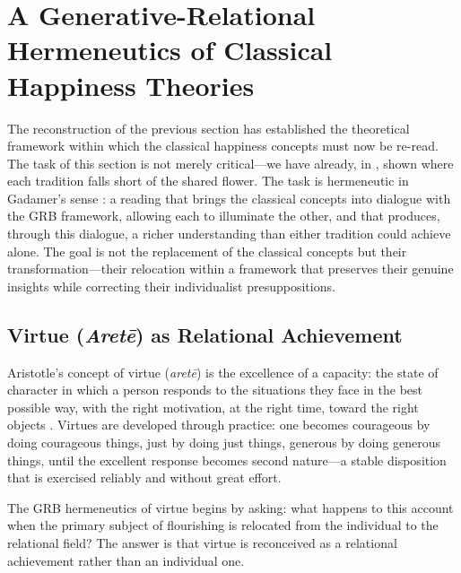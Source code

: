 \section{A Generative-Relational Hermeneutics of Classical Happiness Theories}
\label{p14:sec:hermeneutics}

\noindent
The reconstruction of the previous section has established the theoretical framework within which the classical happiness concepts must now be re-read. The task of this section is not merely critical---we have already, in , shown where each tradition falls short of the shared flower. The task is hermeneutic in Gadamer's sense \parencite{gadamer2004}: a reading that brings the classical concepts into dialogue with the GRB framework, allowing each to illuminate the other, and that produces, through this dialogue, a richer understanding than either tradition could achieve alone. The goal is not the replacement of the classical concepts but their transformation---their relocation within a framework that preserves their genuine insights while correcting their individualist presuppositions.

\subsection{Virtue (\emph{Aret\={e}}) as Relational Achievement}
\label{p14:subsec:arete}

\noindent
Aristotle's concept of virtue (\emph{aret\={e}}) is the excellence of a capacity: the state of character in which a person responds to the situations they face in the best possible way, with the right motivation, at the right time, toward the right objects \parencite{aristotle2000}. Virtues are developed through practice: one becomes courageous by doing courageous things, just by doing just things, generous by doing generous things, until the excellent response becomes second nature---a stable disposition that is exercised reliably and without great effort.

The GRB hermeneutics of virtue begins by asking: what happens to this account when the primary subject of flourishing is relocated from the individual to the relational field? The answer is that virtue is reconceived as a relational achievement rather than an individual one.

